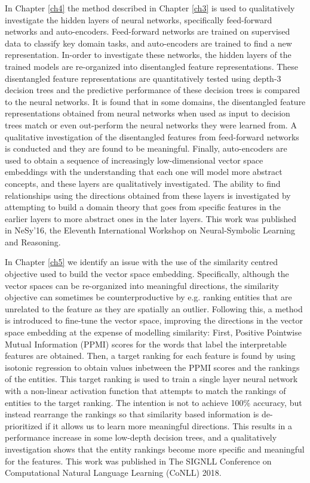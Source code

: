 In Chapter \ref{ch4} the method described in Chapter \ref{ch3} is used to qualitatively investigate the hidden layers of neural networks, specifically feed-forward networks and auto-encoders. Feed-forward networks are trained on supervised data to classify key domain tasks, and auto-encoders are trained to find a new representation. In-order to investigate these networks, the hidden layers of the trained models are re-organized into disentangled feature representations. These disentangled feature representations are quantitatively tested using depth-3 decision trees and the predictive performance of these decision trees is compared to the neural networks. It is found that in some domains, the disentangled feature representations obtained from neural networks when used as input to decision trees match or even out-perform the neural networks they were learned from. A qualitative investigation of the disentangled features from feed-forward networks is conducted and they are found to be meaningful. Finally, auto-encoders are used to obtain a sequence of increasingly low-dimensional vector space embeddings with the understanding that each one will model more abstract concepts, and these layers are qualitatively investigated. The ability to find relationships  using the directions obtained from these layers is investigated  by attempting to build a domain theory that goes from specific features in the earlier layers to more abstract ones in the later layers. This work was published in NeSy'16, the Eleventh International Workshop on Neural-Symbolic Learning and Reasoning.

In Chapter \ref{ch5} we identify an issue with the use of the similarity centred objective used to build the vector space embedding. Specifically, although the vector spaces can be re-organized into meaningful directions, the similarity objective can sometimes be counterproductive by e.g. ranking entities that are unrelated to the feature as they are spatially an outlier. Following this, a method is introduced to fine-tune the vector space, improving the directions in the vector space embedding at the expense of modelling similarity: First, Positive Pointwise Mutual Information (PPMI) scores for the words that label the interpretable features are obtained. Then, a target ranking for each feature is found by using isotonic regression to obtain values inbetween the PPMI scores and the rankings of the entities. This target ranking is used to train a single layer neural network with a non-linear activation function that attempts to match the rankings of entities to the target ranking. The intention is not to achieve 100\% accuracy, but instead rearrange the rankings so that similarity based information is de-prioritized if it allows us to learn more meaningful directions. This results in a performance increase in some low-depth decision trees,  and a qualitatively investigation shows that the entity rankings become more specific and meaningful for the features. This work was published in The SIGNLL Conference on Computational Natural Language Learning (CoNLL) 2018.

